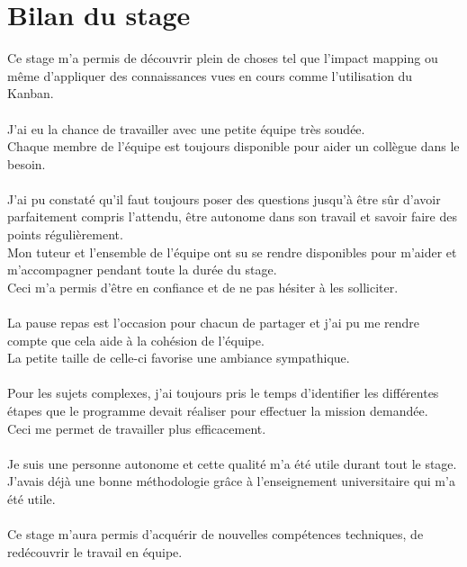 \documentclass[a4paper,twoside,12pt]{report}
\begin{document}
\chapter{Bilan du stage}
Ce stage m’a permis de découvrir plein de choses tel que l'impact mapping ou même d'appliquer des connaissances vues en cours comme l'utilisation du Kanban.\\\\
J'ai eu la chance de travailler avec une petite équipe très soudée.\\
Chaque membre de l'équipe est toujours disponible pour aider un collègue dans le besoin.\\\\
J’ai pu constaté qu’il faut toujours poser des questions jusqu'à être sûr d'avoir parfaitement compris l'attendu, être autonome dans son travail et savoir faire des points régulièrement.\\
Mon tuteur et l'ensemble de l'équipe ont su se rendre disponibles pour m'aider et m'accompagner pendant toute la durée du stage.\\
Ceci m'a permis d'être en confiance et de ne pas hésiter à les solliciter.\\\\
La pause repas est l'occasion pour chacun de partager et j'ai pu me rendre compte que cela aide à la cohésion de l'équipe.\\
La petite taille de celle-ci favorise une ambiance sympathique.\\\\
Pour les sujets complexes, j'ai toujours pris le temps d'identifier les différentes étapes que le programme devait réaliser pour effectuer la mission demandée.\\
Ceci me permet de travailler plus efficacement.\\\\
Je suis une personne autonome et cette qualité m'a été utile durant tout le stage.\\
J'avais déjà une bonne méthodologie grâce à l'enseignement universitaire qui m'a été utile.\\\\
Ce stage m'aura permis d'acquérir de nouvelles compétences techniques, de redécouvrir le travail en équipe.
\end{document}
